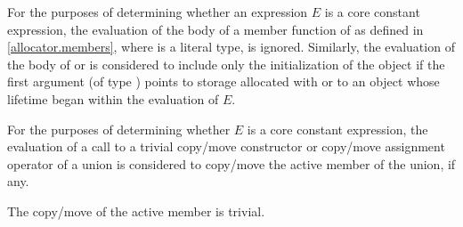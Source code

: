 \pnum
For the purposes of determining
whether an expression $E$ is a core constant expression,
the evaluation of the body of a member function of 
as defined in \ref{allocator.members}, where  is a literal type,
is ignored.
Similarly, the evaluation of the body of
 or
is considered to include only
the initialization of the  object
if the first argument (of type ) points
to storage allocated with  or
to an object whose lifetime began within the evaluation of $E$.

\pnum
For the purposes of determining whether $E$ is a core constant expression,
the evaluation of a call to
a trivial copy/move constructor or copy/move assignment operator of a union
is considered to copy/move the active member of the union, if any.
\begin{note}
The copy/move of the active member is trivial.
\end{note}

